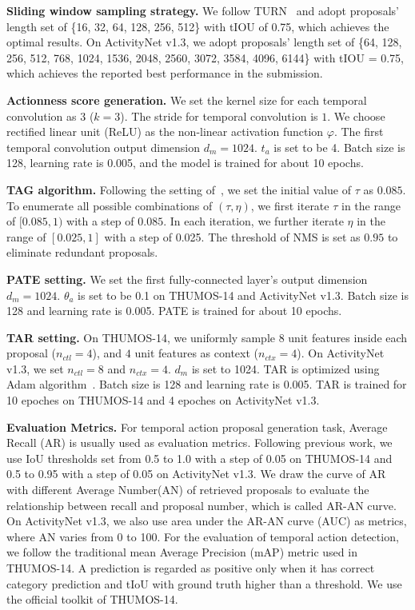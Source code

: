 \documentclass[runningheads]{llncs}
\begin{document}
\textbf{Sliding window sampling strategy.} We follow TURN~\cite{Gao_2017_ICCV} and adopt proposals' length set of \{16, 32, 64, 128, 256, 512\} with tIOU of 0.75, which achieves the optimal results. On ActivityNet v1.3, we adopt proposals' length set of \{64, 128, 256, 512, 768, 1024, 1536, 2048, 2560, 3072, 3584, 4096, 6144\} with tIOU = 0.75, which achieves the reported best performance in the submission.

\textbf{Actionness score generation.} We set the kernel size for each temporal convolution as $3$ ($k=3$). The stride for temporal convolution is $1$. We choose rectified linear unit (ReLU) as the non-linear activation function $\varphi$. The first temporal convolution output dimension $d_m = 1024$. $t_a$ is set to be 4. Batch size is 128, learning rate is 0.005, and the model is trained for about 10 epochs. 

\textbf{TAG algorithm.} Following the setting of~\cite{Zhao_2017_ICCV}, we set the initial value of $\tau$ as $0.085$. To enumerate all possible combinations of $(\tau, \eta)$, we first iterate $\tau$ in the range of $[0.085, 1)$ with a step of $0.085$. In each iteration, we further iterate $\eta$ in the range of $[0.025, 1]$ with a step of 0.025. 
The threshold of NMS is set as $0.95$ to eliminate redundant proposals.

\textbf{PATE setting.} We set the first fully-connected layer's output dimension $d_m = 1024$. $\theta_a$ is set to be 0.1 on THUMOS-14 and ActivityNet v1.3. Batch size is 128 and learning rate is 0.005. PATE is trained for about 10 epochs.

\textbf{TAR setting.} On THUMOS-14, we uniformly sample $8$ unit features inside each proposal ($n_{ctl}=4$), and $4$ unit features as context ($n_{ctx} = 4$). 
On ActivityNet v1.3, we set $n_{ctl}=8$ and $n_{ctx} = 4$. $d_m$ is set to 1024.
TAR is optimized using Adam algorithm~\cite{kingma2014adam}. Batch size is 128 and learning rate is 0.005. TAR is trained for 10 epoches on THUMOS-14 and 4 epoches on ActivityNet v1.3.

\textbf{Evaluation Metrics.} For temporal action proposal generation task, Average Recall (AR) is usually used as evaluation metrics. Following previous work, we use IoU thresholds set from 0.5 to 1.0 with a step of 0.05 on THUMOS-14 and 0.5 to 0.95 with a step of 0.05 on ActivityNet v1.3. We draw the curve of AR with different Average Number(AN) of retrieved proposals to evaluate the relationship between recall and proposal number, which is called AR-AN curve. On ActivityNet v1.3, we also use area under the AR-AN curve (AUC) as metrics, where AN varies from 0 to 100. 
For the evaluation of temporal action detection, we follow the traditional mean Average Precision (mAP) metric
used in THUMOS-14. A prediction is regarded as positive only when it has correct category prediction and tIoU with ground truth higher than a threshold. We use the official toolkit of THUMOS-14.
\end{document}
